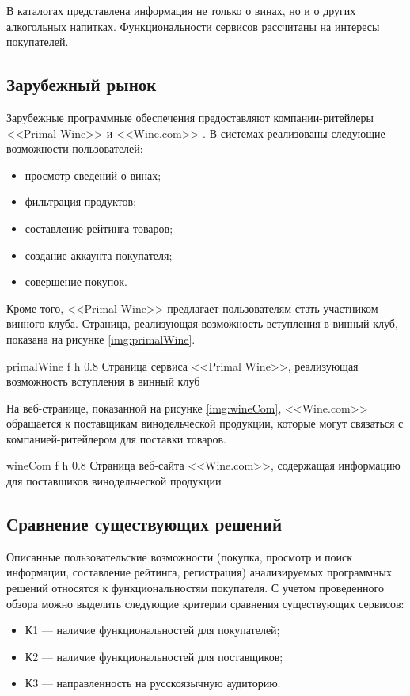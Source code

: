 В каталогах представлена информация не только о винах, но и о других алкогольных напитках. Функциональности сервисов рассчитаны на интересы покупателей.

\subsection{Зарубежный рынок}

Зарубежные программные обеспечения предоставляют компании-ритейлеры <<Primal Wine>> \cite{primal_wine} и <<Wine.com>> \cite{wine_com}. В системах реализованы следующие возможности пользователей:
\begin{itemize}
	\item просмотр сведений о винах;
	\item фильтрация продуктов;
	\item составление рейтинга товаров;
	\item создание аккаунта покупателя;
	\item совершение покупок.
\end{itemize}

Кроме того, <<Primal Wine>> предлагает пользователям стать участником винного клуба. Страница, реализующая возможность вступления в винный клуб, показана на рисунке \ref{img:primalWine}.

    {primalWine}
    {f}
    {h}
    {0.8\textwidth}
    {Страница сервиса <<Primal Wine>>, реализующая возможность вступления в винный клуб}
    
На веб-странице, показанной на рисунке \ref{img:wineCom}, <<Wine.com>> обращается к поставщикам винодельческой продукции, которые могут связаться с компанией-ритейлером для поставки товаров.

    {wineCom}
    {f}
    {h}
    {0.8\textwidth}
    {Страница веб-сайта <<Wine.com>>, содержащая информацию для поставщиков винодельческой продукции}
    
\subsection{Сравнение существующих решений}

Описанные пользовательские возможности (покупка, просмотр и поиск информации, составление рейтинга, регистрация) анализируемых программных решений относятся к функциональностям покупателя. С учетом проведенного обзора можно выделить следующие критерии сравнения существующих сервисов:
\begin{itemize}
	\item К1 --- наличие функциональностей для покупателей;
	\item К2 --- наличие функциональностей для поставщиков;
	\item К3 --- направленность на русскоязычную аудиторию.
\end{itemize}

